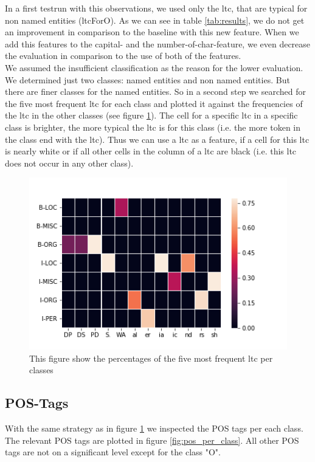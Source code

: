 \documentclass[noindent, nochapname]{tudexercise}
\begin{document}
			In a first testrun with this observations, we used only the ltc, that are typical for non named entities (ltcForO). As we can see in table \ref{tab:results}, we do not get an improvement in comparison to the baseline with this new feature. When we add this features to the capital- and the number-of-char-feature, we even decrease the evaluation in comparison to the use of both of the features.\\
			
			We assumed the insufficient classification as the reason for the lower evaluation. We determined just two classes: named entities and non named entities. But there are finer classes for the named entities. So in a second step we searched for the five most frequent ltc for each class and plotted it against the frequencies of the ltc in the other classes (see figure \ref{fig:ltc_for_all_classes}). The cell for a specific ltc in a specific class is brighter, the more typical the ltc is for this class (i.e. the more token in the class end with the ltc). Thus we can use a ltc as a feature, if a cell for this ltc is nearly white or if all other cells in the column of a ltc are black (i.e. this ltc does not occur in any other class).
			
			\begin{figure}[h]
				\centering
				\includegraphics[scale=0.6]{img/ltc_all_classes.png}
				\caption{This figure show the percentages of the five most frequent ltc per classes}
				\label{fig:ltc_for_all_classes}
			\end{figure}
		
		\subsection{POS-Tags}
			With the same strategy as in figure \ref{fig:ltc_for_all_classes} we inspected the POS tags per each class. The relevant POS tags are plotted in figure \ref{fig:pos_per_class}. All other POS tags are not on a significant level except for the class "O".
			
\end{document}
